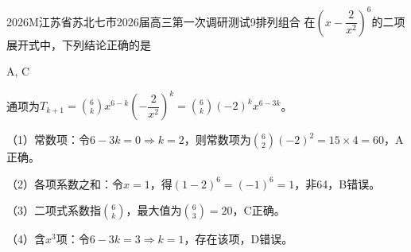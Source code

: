 
\begin{problem}{2026}{M}{江苏省苏北七市2026届高三第一次调研测试}{9}{排列组合}
在$\left(x-\dfrac{2}{x^2}\right)^6$的二项展开式中，下列结论正确的是
\begin{choices}
\end{choices}
\end{problem}

\begin{answer}
A, C
\end{answer}

\begin{solutions}
通项为$T_{k+1}=\binom{6}{k}x^{6-k}\left(-\dfrac{2}{x^2}\right)^k=\binom{6}{k}(-2)^k x^{6-3k}$。

（1）常数项：令$6-3k=0\Rightarrow k=2$，则常数项为$\binom{6}{2}(-2)^2=15\times4=60$，A正确。

（2）各项系数之和：令$x=1$，得$(1-2)^6=(-1)^6=1$，非64，B错误。

（3）二项式系数指$\binom{6}{k}$，最大值为$\binom{6}{3}=20$，C正确。

（4）含$x^3$项：令$6-3k=3\Rightarrow k=1$，存在该项，D错误。
\end{solutions}